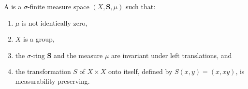 A  is a $\sigma$-finite measure space $(X,\mathbf{S},\mu)$ such that:
\begin{enumerate}
\item[(a)] $\mu$ is not identically zero,
\item[(b)] $X$ is a group,
\item[(c)] the $\sigma$-ring $\mathbf{S}$ and the measure $\mu$ are invariant under left translations, and
\item[(d)] the transformation $S$ of $X \times X$ onto itself, defined by $S(x,y) = (x,xy)$, is measurability preserving.
\end{enumerate}

